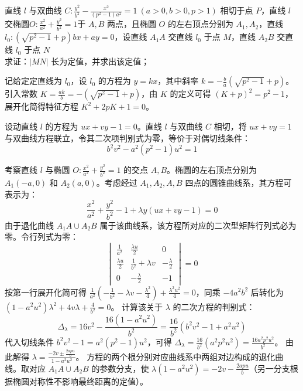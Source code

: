 \begin{exercise}
    直线 \(l\) 与双曲线 \(C: \frac{y^2}{b^2} - \frac{x^2}{(p^2 - 1)a^2} = 1\ (a > 0, b > 0, p > 1)\) 相切于点 \(P\)，直线 \(l\) 交椭圆$O: \frac{x^2}{a^2} + \frac{y^2}{b^2} = 1$于 \(A,B\) 两点，且椭圆 \(O\) 的左右顶点分别为 \(A_1,A_2\)，直线 \(l_0: \left(\sqrt{p^2 - 1} + p\right)bx + ay = 0\)，设直线 \(A_1A\) 交直线 \(l_0\) 于点 \(M\)，直线 \(A_2B\) 交直线 \(l_0\) 于点 \(N\)\\
求证：\(|MN|\) 长为定值，并求出该定值；
\end{exercise}
\begin{solution}
记给定定直线为 $l_0$，设 $l_0$ 的方程为 $y = kx$，其中斜率 $k = -\frac{b}{a}(\sqrt{p^2 - 1} + p)$。引入常数 $K = \frac{ak}{b} = -(\sqrt{p^2 - 1} + p)$，由 $K$ 的定义可得 $(K+p)^2 = p^2-1$，展开化简得特征方程 $K^2 + 2pK + 1 = 0$。

设动直线 $l$ 的方程为 $ux + vy - 1 = 0$。直线 $l$ 与双曲线 $C$ 相切，将 $ux + vy = 1$ 与双曲线方程联立，令其二次项判别式为零，等价于对偶切线条件：
\[ b^2 v^2 - a^2(p^2 - 1)u^2 = 1 \]

考察直线 $l$ 与椭圆 $O: \frac{x^2}{a^2} + \frac{y^2}{b^2} = 1$ 的交点 $A, B$。椭圆的左右顶点分别为 $A_1(-a, 0)$ 和 $A_2(a, 0)$。考虑经过 $A_1, A_2, A, B$ 四点的圆锥曲线系，其方程可表示为：
\[ \frac{x^2}{a^2} + \frac{y^2}{b^2} - 1 + \lambda y (ux + vy - 1) = 0 \]
由于退化曲线 $A_1A \cup A_2B$ 属于该曲线系，该方程所对应的二次型矩阵行列式必为零。令行列式为零：
\[
\begin{vmatrix}
\frac{1}{a^2} & \frac{\lambda u}{2} & 0 \\
\frac{\lambda u}{2} & \frac{1}{b^2} + \lambda v & -\frac{\lambda}{2} \\
0 & -\frac{\lambda}{2} & -1
\end{vmatrix} = 0
\]
按第一行展开化简可得 $\frac{1}{a^2} \left( -\frac{1}{b^2} - \lambda v - \frac{\lambda^2}{4} \right) + \frac{\lambda^2 u^2}{4} = 0$，同乘 $-4a^2b^2$ 后转化为 $(1 - a^2 u^2) \lambda^2 + 4 v \lambda + \frac{4}{b^2} = 0$。
计算该关于 $\lambda$ 的二次方程的判别式：
\[ \Delta_\lambda = 16 v^2 - \frac{16(1 - a^2 u^2)}{b^2} = \frac{16}{b^2} (b^2 v^2 - 1 + a^2 u^2) \]
代入切线条件 $b^2 v^2 - 1 = a^2(p^2 - 1)u^2$，可得 $\Delta_\lambda = \frac{16}{b^2} (a^2 p^2 u^2) = \frac{16 a^2 p^2 u^2}{b^2}$。
由此解得 $\lambda = \frac{-2v \pm \frac{2apu}{b}}{1 - a^2 u^2}$。
方程的两个根分别对应曲线系中两组对边构成的退化曲线。取对应 $A_1A \cup A_2B$ 的参数分支，使 $\lambda(1 - a^2 u^2) = -2v - \frac{2apu}{b}$（另一分支根据椭圆对称性不影响最终距离的定值）。


\end{solution}
